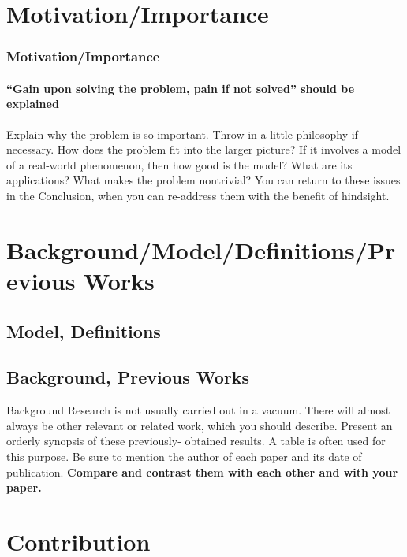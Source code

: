 \documentclass[11pt]{beamer}              %
\begin{document}
\section{Motivation/Importance}
\begin{frame}
\frametitle{Motivation/Importance}
\framesubtitle{``Gain upon solving the problem, pain if not solved'' should be explained}
Explain why the problem is so important. Throw in a little philosophy if necessary. How does the problem fit into the larger picture? If it involves a model of a real-world phenomenon, then how good is the model? What are its applications? What makes the problem nontrivial? You can return to these issues in the Conclusion, when you can re-address them with the benefit of hindsight.
\end{frame}

\section{Background/Model/Definitions/Previous Works}


\subsection{Model, Definitions}


\subsection{Background, Previous Works}
\begin{frame}{Background}
Research is not usually carried out in a vacuum. There will almost always be other relevant or related work, which you should describe. Present an orderly synopsis of these previously- obtained results. A table is often used for this purpose. Be sure to mention the author of each paper and its date of publication. \textbf{Compare and contrast them with each other and with your paper.}
\end{frame}




\section{Contribution}
\end{document}
